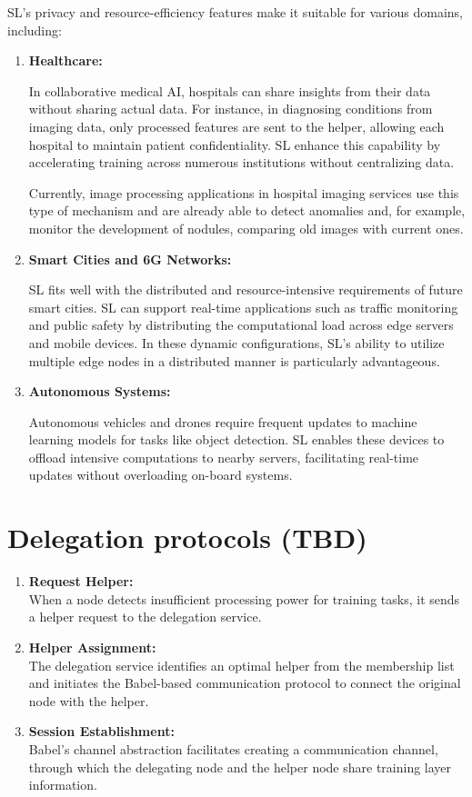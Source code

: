 SL's privacy and resource-efficiency features make it suitable for various domains, including:

\begin{enumerate}
	\item \textbf{Healthcare:}
	
	In collaborative medical AI, hospitals can share insights from their data without sharing actual data. For instance, in diagnosing conditions from imaging data, only processed features are sent to the helper, allowing each hospital to maintain patient confidentiality. \gls{SL} enhance this capability by accelerating training across numerous institutions without centralizing data. 
	
	Currently, image processing applications in hospital imaging services use this type of mechanism and are already able to detect anomalies and, for example, monitor the development of nodules, comparing old images with current ones. 
	\item \textbf{Smart Cities and 6G Networks:}
	
	SL fits well with the distributed and resource-intensive requirements of future smart cities. SL can support real-time applications such as traffic monitoring and public safety by distributing the computational load across edge servers and mobile devices. In these dynamic configurations, \gls{SL}’s ability to utilize multiple edge nodes in a distributed manner is particularly advantageous. 
	\item \textbf{Autonomous Systems:}
	 
	Autonomous vehicles and drones require frequent updates to machine learning models for tasks like object detection. \gls{SL} enables these devices to offload intensive computations to nearby servers, facilitating real-time updates without overloading on-board systems. ​

\end{enumerate}


\section{Delegation protocols (TBD)}
\label{sec:delegation_protocols}


\begin{enumerate}
	\item \textbf{Request Helper:} \\ When a node detects insufficient processing power for training tasks, it sends a helper request to the delegation service.
	\item \textbf{Helper Assignment:} \\ The delegation service identifies an optimal helper from the membership list and initiates the Babel-based communication protocol to connect the original node with the helper.
	\item \textbf{Session Establishment:} \\ Babel's channel abstraction facilitates creating a communication channel, through which the delegating node and the helper node share training layer information.

\end{enumerate}

